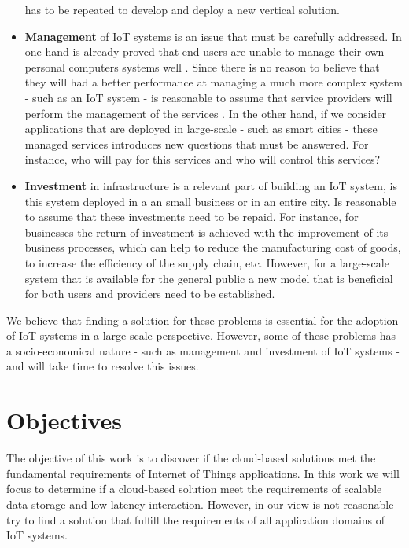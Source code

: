 \begin{itemize}
  has to be repeated to develop and deploy a new vertical solution.
  \item \textbf{Management} of IoT systems is an issue that must be carefully addressed. In one hand
  is already proved that end-users are unable to manage their own personal computers systems well
  \cite{doll1988measurement}. Since there is no reason to believe that they will had a better
  performance at managing a much more complex system - such as an \gls{IoT} system - is reasonable to
  assume that service providers will perform the management of the services . In the other hand, if we
  consider applications that are deployed in large-scale - such as smart cities - these managed
  services introduces new questions that must be answered. For instance, who will pay for this
  services and who will control this services?
  \item \textbf{Investment} in infrastructure is a relevant part of building an \gls{IoT} system,
  is this system deployed in a an small business or in an entire city. Is reasonable to assume that
  these investments need to be repaid. For instance, for businesses the return of investment is
  achieved with the improvement of its business processes, which can help to reduce the manufacturing
  cost of goods, to increase the efficiency of the supply chain, etc. However, for a large-scale
  system that is available for the general public a new model that is beneficial for both users and
  providers need to be established.
\end{itemize}

We believe that finding a solution for these problems is essential for the adoption of \gls{IoT} systems
in a large-scale perspective. However, some of these problems has a socio-economical nature - such as
management and investment of \gls{IoT} systems - and will take time to resolve this issues.

\section{Objectives}
\label{section:objectives}
The objective of this work is to discover if the cloud-based solutions met the fundamental requirements
of Internet of Things applications. In this work we will focus to determine if a cloud-based solution meet
the requirements of scalable data storage and low-latency interaction. However, in our view is not
reasonable try to find a solution that fulfill the requirements of all application domains of \gls{IoT} systems.\\

